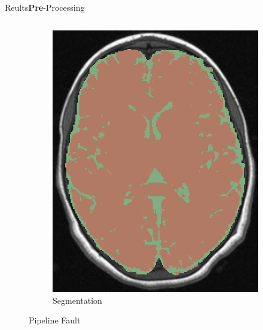 \documentclass[]{standalone}
\begin{document}
\begin{frame}{Reults}{\textbf{Pre}-Processing}
\begin{columns}
\begin{column}{0.45\textwidth}
\begin{figure}[h!]
\begin{subfigure}[h!]{0.49\textwidth}
			     \includegraphics[scale=0.11]{./IMG/SEG0.png}
			     \caption*{Segmentation}
			\end{subfigure}
			\caption*{Pipeline Fault}
		\end{figure}
		\end{column}
		

\end{columns}
\end{frame}
\end{document}
